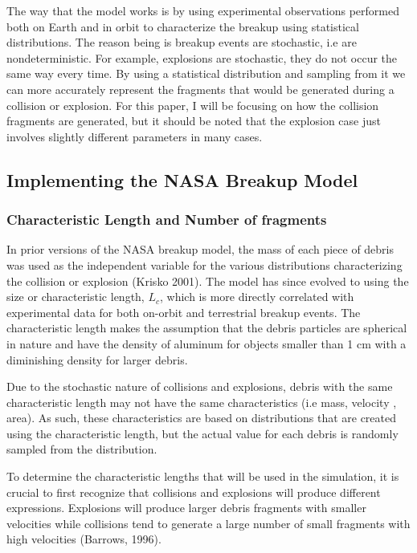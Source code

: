 \documentclass{article}
\begin{document}
The way that the model works is by using experimental observations performed both on Earth and in orbit to characterize the breakup using statistical distributions. The reason being is breakup events are stochastic, i.e are nondeterministic.  For example, explosions are stochastic, they do not occur the same way every time.  By using a statistical distribution and sampling from it we can more accurately represent the fragments that would be generated during a collision or explosion. For this paper, I will be focusing on how the collision fragments are generated, but it should be noted that the explosion case just involves slightly different parameters in many cases.

\newpage

\subsection{Implementing the NASA Breakup Model}

\subsubsection{Characteristic Length and Number of fragments}

In prior versions of the NASA breakup model, the mass of each piece of debris was used as the independent variable for the various distributions characterizing the collision or explosion (Krisko 2001). The model has since evolved to using the size or characteristic length, $L_c$, which is more directly correlated with experimental data for both on-orbit and terrestrial breakup events. The characteristic length makes the assumption that the debris particles are spherical in nature and have the density of aluminum for objects smaller than 1 cm with a diminishing density for larger debris. 

Due to the stochastic nature of collisions and explosions, debris with the same characteristic length may not have the same characteristics (i.e mass, velocity , area). As such, these characteristics are based on distributions that are created using the characteristic length, but the actual value for each debris is randomly sampled from the distribution.

To determine the characteristic lengths that will be used in the simulation, it is crucial to first recognize that collisions and explosions will produce different expressions. Explosions will produce larger debris fragments with smaller velocities while collisions tend to generate a large number of small fragments with high velocities (Barrows, 1996). 
\end{document}
